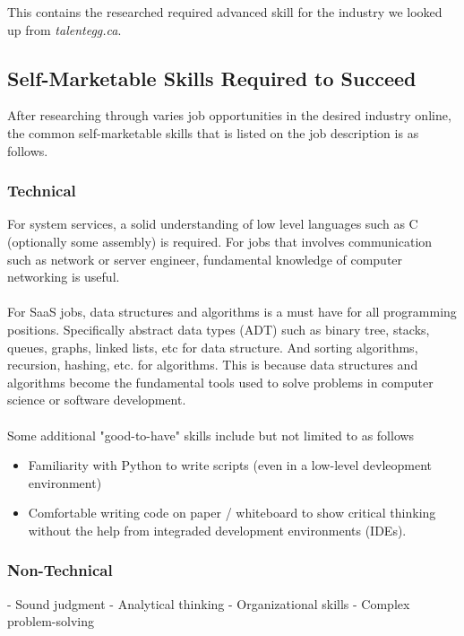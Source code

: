 \documentclass[10pt,letterpaper]{article}
\begin{document}



This contains the researched required advanced skill for the industry we looked up from \textit{talentegg.ca}\cite{talentegg}.

\subsection{Self-Marketable Skills Required to Succeed}

After researching through varies job opportunities in the desired industry online, the common self-marketable skills that is listed on the job description is as follows.

\subsubsection{Technical}

For system services, a solid understanding of low level languages such as C (optionally some assembly) is required. For jobs that involves communication such as network or server engineer, fundamental knowledge of computer networking is useful.\\
\\
For SaaS jobs, data structures and algorithms is a must have for all programming positions. Specifically abstract data types (ADT) such as binary tree, stacks, queues, graphs, linked lists, etc for data structure. And sorting algorithms, recursion, hashing, etc. for algorithms. This is because data structures and algorithms become the fundamental tools used to solve problems in computer science or software development.\\
\\
Some additional "good-to-have" skills include but not limited to as follows
\begin{itemize}
	\item Familiarity with Python to write scripts (even in a low-level devleopment environment)
	\item Comfortable writing code on paper / whiteboard to show critical thinking without the help from integraded development environments (IDEs).
\end{itemize}

\subsubsection{Non-Technical}
- Sound judgment
- Analytical thinking
- Organizational skills
- Complex problem-solving
\end{document}

